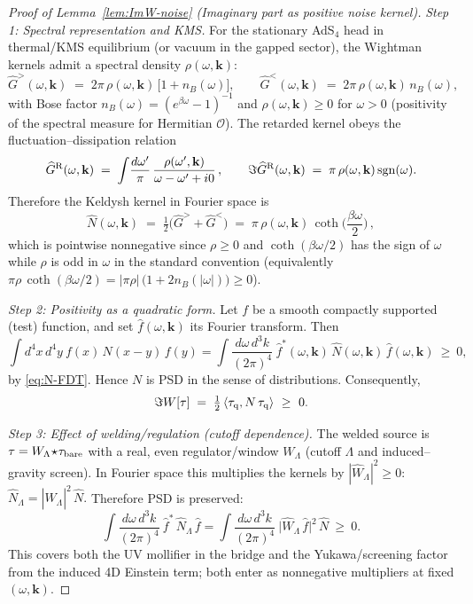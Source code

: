 \documentclass[10pt]{article}
\theoremstyle{definition}
\theoremstyle{plain}
\begin{document}
\begin{proof}[Proof of Lemma~\ref{lem:ImW-noise} (Imaginary part as positive noise kernel)]
\smallskip
\noindent
\emph{Step 1: Spectral representation and KMS.}
For the stationary AdS$_4$ head in thermal/KMS equilibrium (or vacuum in the gapped sector), the Wightman kernels admit a spectral density $\rho(\omega,\mathbf k)$:
\[
\widehat{G}^{>}(\omega,\mathbf k)\;=\;2\pi\,\rho(\omega,\mathbf k)\,\big[1+n_B(\omega)\big],\qquad
\widehat{G}^{<}(\omega,\mathbf k)\;=\;2\pi\,\rho(\omega,\mathbf k)\,n_B(\omega),
\]
with Bose factor $n_B(\omega)=(e^{\beta\omega}-1)^{-1}$ and \(\rho(\omega,\mathbf k)\ge 0\) for $\omega>0$ (positivity of the spectral measure for Hermitian $\mathcal O$). The retarded kernel obeys the fluctuation–dissipation relation
\[
\widehat{G}^{\rm R}(\omega,\mathbf k)\;=\;\int\!\frac{d\omega'}{\pi}\,\frac{\rho(\omega',\mathbf k)}{\omega-\omega'+i0}\,,
\qquad
\Im \widehat{G}^{\rm R}(\omega,\mathbf k)\;=\;\pi\,\rho(\omega,\mathbf k)\,\mathrm{sgn}(\omega).
\]
Therefore the Keldysh kernel in Fourier space is
\begin{equation}
\widehat{N}(\omega,\mathbf k)\;=\;\tfrac12\big(\widehat{G}^{>}+\widehat{G}^{<}\big)
\;=\;\pi\,\rho(\omega,\mathbf k)\,\coth\!\Big(\frac{\beta\omega}{2}\Big)\,,
\label{eq:N-FDT}
\end{equation}
which is pointwise nonnegative since $\rho\ge 0$ and $\coth(\beta\omega/2)$ has the sign of $\omega$ while $\rho$ is odd in $\omega$ in the standard convention (equivalently $\pi\rho\,\coth(\beta\omega/2)=|\pi\rho|\,\big(1+2n_B(|\omega|)\big)\ge 0$).

\smallskip
\noindent
\emph{Step 2: Positivity as a quadratic form.}
Let $f$ be a smooth compactly supported (test) function, and set $\widehat{f}(\omega,\mathbf k)$ its Fourier transform. Then
\[
\int\! d^4x\,d^4y\ f(x)\,N(x-y)\,f(y)
=\int\!\frac{d\omega\,d^3k}{(2\pi)^4}\ \widehat{f}^\ast(\omega,\mathbf k)\,\widehat{N}(\omega,\mathbf k)\,\widehat{f}(\omega,\mathbf k)\ \ge\ 0,
\]
by \eqref{eq:N-FDT}. Hence $N$ is PSD in the sense of distributions. Consequently,
\[
\Im W[\tau]\;=\;\tfrac12\,\langle \tau_{\rm q}, N\,\tau_{\rm q}\rangle\ \ge\ 0.
\]

\smallskip
\noindent
\emph{Step 3: Effect of welding/regulation (cutoff dependence).}
The welded source is $\tau=W_\Lambda\!\star\!\tau_{\rm bare}$ with a real, even regulator/window $W_\Lambda$ (cutoff $\Lambda$ and induced–gravity screen). In Fourier space this multiplies the kernels by $|\widehat{W}_\Lambda|^2\ge 0$:
\(
\widehat{N}_\Lambda=|\widehat{W}_\Lambda|^2\,\widehat{N}.
\)
Therefore PSD is preserved:
\[
\int\!\frac{d\omega\,d^3k}{(2\pi)^4}\ \widehat{f}^\ast\,\widehat{N}_\Lambda\,\widehat{f}
=\int\!\frac{d\omega\,d^3k}{(2\pi)^4}\ \big|\widehat{W}_\Lambda\,\widehat{f}\big|^2\,\widehat{N}\ \ge\ 0.
\]
This covers both the UV mollifier in the bridge and the Yukawa/screening factor from the induced 4D Einstein term; both enter as nonnegative multipliers at fixed $(\omega,\mathbf k)$.


\end{proof}
\end{document}
